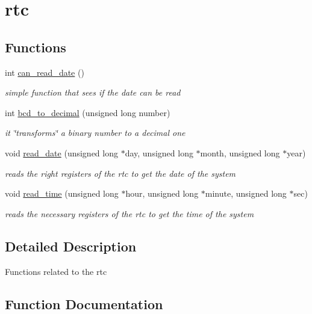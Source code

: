 \hypertarget{group__rtc}{}\section{rtc}
\label{group__rtc}
\subsection*{Functions}
\begin{DoxyCompactItemize}
\item 
int \hyperlink{group__rtc_ga5960e020c86a383a63cdead42f3928b9}{can\+\_\+read\+\_\+date} ()
\begin{DoxyCompactList}\small\item\em simple function that sees if the date can be read \end{DoxyCompactList}\item 
int \hyperlink{group__rtc_ga841ea89e213413164d1e5e4a9394a955}{bcd\+\_\+to\+\_\+decimal} (unsigned long number)
\begin{DoxyCompactList}\small\item\em it \char`\"{}transforms\char`\"{} a binary number to a decimal one \end{DoxyCompactList}\item 
void \hyperlink{group__rtc_ga2ed53b5a2ef633341d444c26659c2e58}{read\+\_\+date} (unsigned long $\ast$day, unsigned long $\ast$month, unsigned long $\ast$year)
\begin{DoxyCompactList}\small\item\em reads the right registers of the rtc to get the date of the system \end{DoxyCompactList}\item 
void \hyperlink{group__rtc_ga361f06856ed8c5dfb47c2e01af6a7470}{read\+\_\+time} (unsigned long $\ast$hour, unsigned long $\ast$minute, unsigned long $\ast$sec)
\begin{DoxyCompactList}\small\item\em reads the necessary registers of the rtc to get the time of the system \end{DoxyCompactList}\end{DoxyCompactItemize}


\subsection{Detailed Description}
Functions related to the rtc 

\subsection{Function Documentation}
